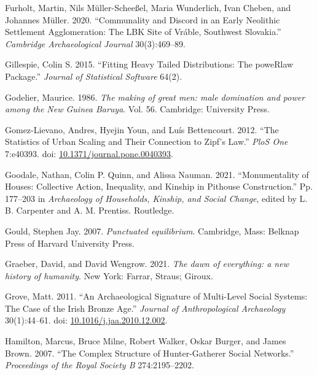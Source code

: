 \documentclass[
  12pt,
]{book}
\newlength{\cslhangindent}
\newlength{\cslentryspacingunit} %
\newenvironment{CSLReferences}[2] %
 {%
  \setlength{\parindent}{0pt}
  \ifodd #1
  \let\oldpar\par
  \def\par{\hangindent=\cslhangindent\oldpar}
  \fi
  \setlength{\parskip}{#2\cslentryspacingunit}
 }%
 {}
\begin{document}
\begin{CSLReferences}{1}{0}
\leavevmode{}%
Furholt, Martin, Nils Müller-Scheeßel, Maria Wunderlich, Ivan Cheben, and Johannes Müller. 2020. {``Communality and Discord in an Early Neolithic Settlement Agglomeration: The LBK Site of Vráble, Southwest Slovakia.''} \emph{Cambridge Archaeological Journal} 30(3):469--89.

\leavevmode{}%
Gillespie, Colin S. 2015. {``Fitting Heavy Tailed Distributions: The poweRlaw Package.''} \emph{Journal of Statistical Software} 64(2).

\leavevmode{}%
Godelier, Maurice. 1986. \emph{The making of great men: male domination and power among the New Guinea Baruya}. Vol. 56. Cambridge: University Press.

\leavevmode{}%
Gomez-Lievano, Andres, Hyejin Youn, and Luís Bettencourt. 2012. {``The Statistics of Urban Scaling and Their Connection to Zipf{'}s Law.''} \emph{PloS One} 7:e40393. doi: \href{https://doi.org/10.1371/journal.pone.0040393}{10.1371/journal.pone.0040393}.

\leavevmode{}%
Goodale, Nathan, Colin P. Quinn, and Alissa Nauman. 2021. {``Monumentality of Houses: {Collective} Action, Inequality, and Kinship in Pithouse Construction.''} Pp. 177--203 in \emph{Archaeology of {Households}, {Kinship}, and {Social Change}}, edited by L. B. Carpenter and A. M. Prentiss. {Routledge}.

\leavevmode{}%
Gould, Stephen Jay. 2007. \emph{Punctuated equilibrium}. Cambridge, Mass: Belknap Press of Harvard University Press.

\leavevmode{}%
Graeber, David, and David Wengrow. 2021. \emph{The dawn of everything: a new history of humanity}. New York: Farrar, Straus; Giroux.

\leavevmode{}%
Grove, Matt. 2011. {``An Archaeological Signature of Multi-Level Social Systems: The Case of the Irish Bronze Age.''} \emph{Journal of Anthropological Archaeology} 30(1):44--61. doi: \href{https://doi.org/10.1016/j.jaa.2010.12.002}{10.1016/j.jaa.2010.12.002}.

\leavevmode{}%
Hamilton, Marcus, Bruce Milne, Robert Walker, Oskar Burger, and James Brown. 2007. {``The Complex Structure of Hunter-Gatherer Social Networks.''} \emph{Proceedings of the Royal Society B} 274:2195--2202.


\end{CSLReferences}
\end{document}
